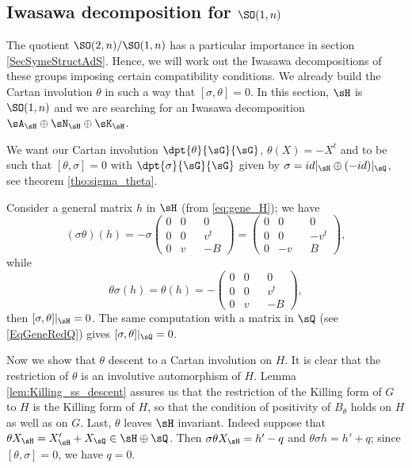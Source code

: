 \subsection{Iwasawa decomposition for \texorpdfstring{$\SO(1,n)$}{SO1n}}
\label{SubSecIwaSOunn}

The quotient $\SO(2,n)/\SO(1,n)$ has a particular importance in section \ref{SecSymeStructAdS}. Hence, we will work out the Iwasawa decompositions of these groups imposing certain compatibility conditions. We already build the Cartan involution $\theta$ in such a way that $[\sigma,\theta]=0$. In this section, \( \sH\) is \( \SO(1,n)\) and we are searching for an Iwasawa decomposition \( \sA_{\sH}\oplus\sN_{\sH}\oplus\sK_{\sH}\). 

We want our Cartan involution $\dpt{\theta}{\sG}{\sG}$, $\theta(X)=-X^t$ and to be such that $[\theta,\sigma]=0$ with $\dpt{\sigma}{\sG}{\sG}$ given by $\sigma=id|_{\sH}\oplus(-id)|_{\sQ}$, see theorem \ref{tho:sigma_theta}.\label{pg:calcul_sigma_theta}

Consider a general matrix $h$ in $\sH$ (from \eqref{eq:gene_H}); we have
\[
  (\sigma\theta)(h)=-\sigma
  \begin{pmatrix}
  0&0&&0\\
  0&0&&v^t\\
  0&v&&-B
  \end{pmatrix}=
  \begin{pmatrix}
  0&0&&0\\
  0&0&&-v^t\\
  0&-v&&B
  \end{pmatrix},
\]
while
\[
  \theta\sigma(h)=\theta(h)=-
  \begin{pmatrix}
  0&0&&0\\
  0&0&&v^t\\
  0&v&&-B
  \end{pmatrix},
\] 
then $[\sigma,\theta]|_{\sH}=0$. The same computation with a matrix in $\sQ$ (see \eqref{EqGeneRedQ}) gives $[\sigma,\theta]|_{\sQ}=0$.

Now we show that $\theta$ descent to a Cartan involution on $H$. It is clear that the restriction of $\theta$ is an involutive automorphism of $H$. Lemma \ref{lem:Killing_ss_descent} assures us that the restriction of the Killing form of $G$ to $H$ is the Killing form of $H$, so that the condition of positivity of $B_{\theta}$ holds on $H$ as well as on $G$. Last, $\theta$ leaves $\sH$ invariant. Indeed suppose that  $\theta X_{\sH}=X'_{\sH}+X_{\sQ}\in\sH\oplus\sQ$. Then $\sigma\theta X_{\sH}=h'-q$ and $\theta\sigma h=h'+q$; since $[\theta,\sigma]=0$, we have $q=0$.

